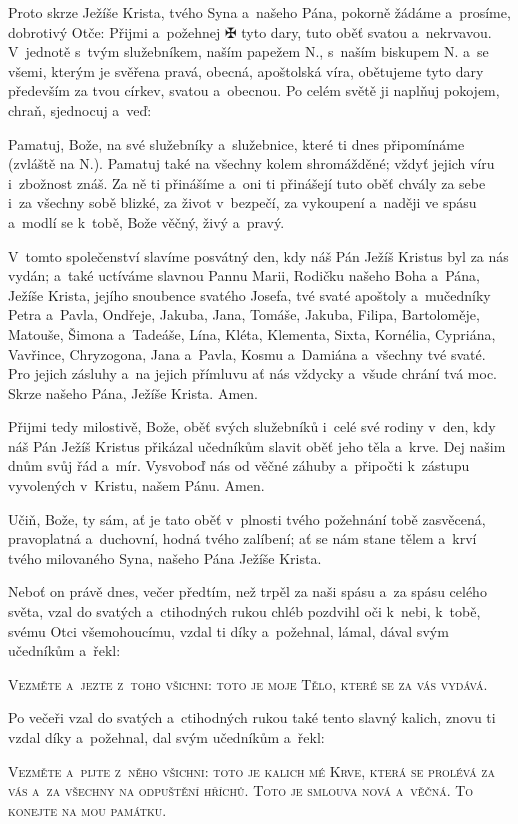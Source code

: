 Proto skrze Ježíše Krista, tvého Syna a~našeho Pána, pokorně žádáme a~prosíme, dobrotivý Otče: Přijmi a~požehnej {\color{red}✠} tyto dary, tuto oběť svatou a~nekrvavou. V~jednotě s~tvým služebníkem, naším papežem {\color{red}N.}, s~naším biskupem {\color{red}N.} a~se všemi, kterým je svěřena pravá, obecná, apoštolská víra, obětujeme tyto dary především za tvou církev, svatou a~obecnou. Po celém světě ji naplňuj pokojem, chraň, sjednocuj a~veď:

Pamatuj, Bože, na své služebníky a~služebnice, které ti dnes připomínáme (zvláště na {\color{red}N.}). Pamatuj také na všechny kolem shromážděné; vždyť jejich víru i~zbožnost znáš. Za ně ti přinášíme a~oni ti přinášejí tuto oběť chvály  za sebe i~za všechny sobě blizké, za život v~bezpečí, za vykoupení a~naději ve spásu a~modlí se k~tobě, Bože věčný, živý a~pravý.

V~tomto společenství slavíme posvátný den, kdy náš Pán Ježíš Kristus byl za nás vydán; a~také uctíváme slavnou Pannu Marii, Rodičku našeho Boha a~Pána, Ježíše Krista, jejího snoubence svatého Josefa, tvé svaté apoštoly a~mučedníky Pe\-tra a~Pavla, Ondřeje, Jakuba, Jana, Tomáše, Jakuba, Filipa, Bartoloměje, Matouše, Šimona a~Tadeáše, Lína, Kléta, Klementa, Sixta, Kornélia, Cypriána, Vavřince, Chryzogona, Jana a~Pavla, Kosmu a~Damiána a~všechny tvé svaté. Pro jejich zásluhy a~na jejich pří\-mluvu ať nás vždycky a~všude chrání tvá moc. Skrze našeho Pána, Ježíše Krista. Amen.

Přijmi tedy milostivě, Bože, oběť svých služebníků i~celé své rodiny v~den, kdy náš Pán Ježíš Kristus přikázal učedníkům sla\-vit oběť jeho těla a~krve. Dej našim dnům svůj řád a~mír. Vysvoboď nás od věčné záhuby a~připočti k~zástupu vyvolených v~Kristu, našem Pánu. Amen.

Učiň, Bože, ty sám, ať je tato oběť v~plnosti tvého požehnání tobě zasvěcená, pravoplatná a~duchovní, hodná tvého zalíbení; ať se nám stane tělem a~krví tvého milovaného Syna, našeho Pána Ježíše Krista.

Neboť on právě dnes, večer předtím, než trpěl za naši spásu a~za spásu celého světa, vzal do svatých a~ctihodných rukou chléb pozdvihl oči k~nebi, k~tobě, svému Otci všemohoucímu, vzdal ti díky a~požehnal, lámal, dával svým učedníkům a~řekl:

\textsc{Vezměte a~jezte z~toho všichni: toto je moje Tělo, které se za vás vydává.}

Po večeři vzal do svatých a~ctihodných rukou také tento slavný kalich, znovu ti vzdal díky a~požehnal, dal svým učedníkům a~řekl:

\textsc{Vezměte a~pi\mbox{}jte z~něho všichni: toto je kalich mé Krve, která se prolévá za vás a~za všechny na odpuštění hříchů. Toto je smlouva nová a~věčná. To konejte na mou památku.}
